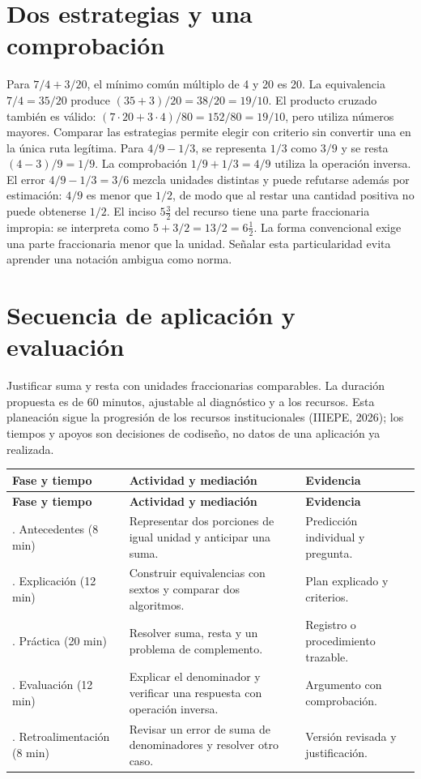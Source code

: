 \documentclass[spanish,letterpaper,oneside]{article}
\begin{document}
\section{Dos estrategias y una comprobación}
Para $7/4+3/20$, el mínimo común múltiplo de 4 y 20 es 20. La equivalencia $7/4=35/20$ produce $(35+3)/20=38/20=19/10$. El producto cruzado también es válido: $(7\cdot20+3\cdot4)/80=152/80=19/10$, pero utiliza números mayores. Comparar las estrategias permite elegir con criterio sin convertir una en la única ruta legítima.
Para $4/9-1/3$, se representa $1/3$ como $3/9$ y se resta $(4-3)/9=1/9$. La comprobación $1/9+1/3=4/9$ utiliza la operación inversa. El error $4/9-1/3=3/6$ mezcla unidades distintas y puede refutarse además por estimación: $4/9$ es menor que $1/2$, de modo que al restar una cantidad positiva no puede obtenerse $1/2$.
El inciso $5\frac32$ del recurso tiene una parte fraccionaria impropia: se interpreta como $5+3/2=13/2=6\frac12$. La forma convencional exige una parte fraccionaria menor que la unidad. Señalar esta particularidad evita aprender una notación ambigua como norma.
\section{Secuencia de aplicación y evaluación}
Justificar suma y resta con unidades fraccionarias comparables. La duración propuesta es de 60 minutos, ajustable al diagnóstico y a los recursos. Esta planeación sigue la progresión de los recursos institucionales (IIIEPE, 2026); los tiempos y apoyos son decisiones de codiseño, no datos de una aplicación ya realizada.

{\small{}\renewcommand{\arraystretch}{1.25}
\begin{longtable}{|>{\raggedright\arraybackslash}p{}|>{\raggedright\arraybackslash}p{}|>{\raggedright\arraybackslash}p{}|}\hline
\rowcolor{iiiepePale} \textbf{Fase y tiempo} & \textbf{Actividad y mediación} & \textbf{Evidencia} \\\hline
\endfirsthead
\hline
\rowcolor{iiiepePale} \textbf{Fase y tiempo} & \textbf{Actividad y mediación} & \textbf{Evidencia} \\\hline
\endhead
1. Antecedentes (8 min) & Representar dos porciones de igual unidad y anticipar una suma. & Predicción individual y pregunta. \\\hline
2. Explicación (12 min) & Construir equivalencias con sextos y comparar dos algoritmos. & Plan explicado y criterios. \\\hline
3. Práctica (20 min) & Resolver suma, resta y un problema de complemento. & Registro o procedimiento trazable. \\\hline
4. Evaluación (12 min) & Explicar el denominador y verificar una respuesta con operación inversa. & Argumento con comprobación. \\\hline
5. Retroalimentación (8 min) & Revisar un error de suma de denominadores y resolver otro caso. & Versión revisada y justificación. \\\hline
\end{longtable}}
\end{document}
